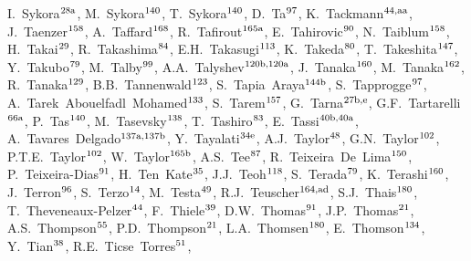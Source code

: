 \begin{flushleft}
I.~Sykora$^\textrm{\scriptsize 28a}$,    
M.~Sykora$^\textrm{\scriptsize 140}$,    
T.~Sykora$^\textrm{\scriptsize 140}$,    
D.~Ta$^\textrm{\scriptsize 97}$,    
K.~Tackmann$^\textrm{\scriptsize 44,aa}$,    
J.~Taenzer$^\textrm{\scriptsize 158}$,    
A.~Taffard$^\textrm{\scriptsize 168}$,    
R.~Tafirout$^\textrm{\scriptsize 165a}$,    
E.~Tahirovic$^\textrm{\scriptsize 90}$,    
N.~Taiblum$^\textrm{\scriptsize 158}$,    
H.~Takai$^\textrm{\scriptsize 29}$,    
R.~Takashima$^\textrm{\scriptsize 84}$,    
E.H.~Takasugi$^\textrm{\scriptsize 113}$,    
K.~Takeda$^\textrm{\scriptsize 80}$,    
T.~Takeshita$^\textrm{\scriptsize 147}$,    
Y.~Takubo$^\textrm{\scriptsize 79}$,    
M.~Talby$^\textrm{\scriptsize 99}$,    
A.A.~Talyshev$^\textrm{\scriptsize 120b,120a}$,    
J.~Tanaka$^\textrm{\scriptsize 160}$,    
M.~Tanaka$^\textrm{\scriptsize 162}$,    
R.~Tanaka$^\textrm{\scriptsize 129}$,    
B.B.~Tannenwald$^\textrm{\scriptsize 123}$,    
S.~Tapia~Araya$^\textrm{\scriptsize 144b}$,    
S.~Tapprogge$^\textrm{\scriptsize 97}$,    
A.~Tarek~Abouelfadl~Mohamed$^\textrm{\scriptsize 133}$,    
S.~Tarem$^\textrm{\scriptsize 157}$,    
G.~Tarna$^\textrm{\scriptsize 27b,e}$,    
G.F.~Tartarelli$^\textrm{\scriptsize 66a}$,    
P.~Tas$^\textrm{\scriptsize 140}$,    
M.~Tasevsky$^\textrm{\scriptsize 138}$,    
T.~Tashiro$^\textrm{\scriptsize 83}$,    
E.~Tassi$^\textrm{\scriptsize 40b,40a}$,    
A.~Tavares~Delgado$^\textrm{\scriptsize 137a,137b}$,    
Y.~Tayalati$^\textrm{\scriptsize 34e}$,    
A.J.~Taylor$^\textrm{\scriptsize 48}$,    
G.N.~Taylor$^\textrm{\scriptsize 102}$,    
P.T.E.~Taylor$^\textrm{\scriptsize 102}$,    
W.~Taylor$^\textrm{\scriptsize 165b}$,    
A.S.~Tee$^\textrm{\scriptsize 87}$,    
R.~Teixeira~De~Lima$^\textrm{\scriptsize 150}$,    
P.~Teixeira-Dias$^\textrm{\scriptsize 91}$,    
H.~Ten~Kate$^\textrm{\scriptsize 35}$,    
J.J.~Teoh$^\textrm{\scriptsize 118}$,    
S.~Terada$^\textrm{\scriptsize 79}$,    
K.~Terashi$^\textrm{\scriptsize 160}$,    
J.~Terron$^\textrm{\scriptsize 96}$,    
S.~Terzo$^\textrm{\scriptsize 14}$,    
M.~Testa$^\textrm{\scriptsize 49}$,    
R.J.~Teuscher$^\textrm{\scriptsize 164,ad}$,    
S.J.~Thais$^\textrm{\scriptsize 180}$,    
T.~Theveneaux-Pelzer$^\textrm{\scriptsize 44}$,    
F.~Thiele$^\textrm{\scriptsize 39}$,    
D.W.~Thomas$^\textrm{\scriptsize 91}$,    
J.P.~Thomas$^\textrm{\scriptsize 21}$,    
A.S.~Thompson$^\textrm{\scriptsize 55}$,    
P.D.~Thompson$^\textrm{\scriptsize 21}$,    
L.A.~Thomsen$^\textrm{\scriptsize 180}$,    
E.~Thomson$^\textrm{\scriptsize 134}$,    
Y.~Tian$^\textrm{\scriptsize 38}$,    
R.E.~Ticse~Torres$^\textrm{\scriptsize 51}$,    

\end{flushleft}
